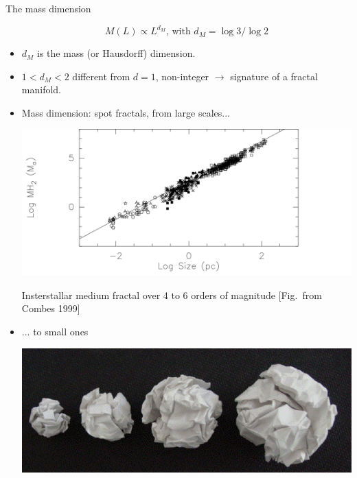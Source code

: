 \documentclass[xcolor=x11names,compress,professionalfonts]{beamer}
\renewcommand{\(}{\begin{columns}}
\renewcommand{\)}{\end{columns}}
\newcommand{\<}[1]{\begin{column}{#1}}
\renewcommand{\>}{\end{column}}
\begin{document}
\begin{frame}{The mass dimension}
\begin{itemize}
\[ M(L) \propto L^{d_M} \text{, with } d_M = \log 3/\log 2 \]

	\item $d_M$ is the mass (or Hausdorff) dimension.
	
	\item $1 < d_M < 2$ different from $d = 1$, non-integer $\rightarrow$ signature of a fractal manifold.

\end{itemize}

\end{frame}

\begin{frame}

\begin{itemize}
\item Mass dimension: spot fractals, from large scales... 

	{\centering
    \includegraphics[scale=.18]{combes_interstellar_medium.png}
    \scriptsize
    
    Insterstallar medium fractal over 4 to 6 orders of magnitude [Fig.\ from Combes 1999]
    
    }
\item  ... to small ones

  	\centering
    \includegraphics[scale=.3]{crumpled_paper.png}
    \scriptsize
\end{itemize}
\end{frame}
\end{document}
